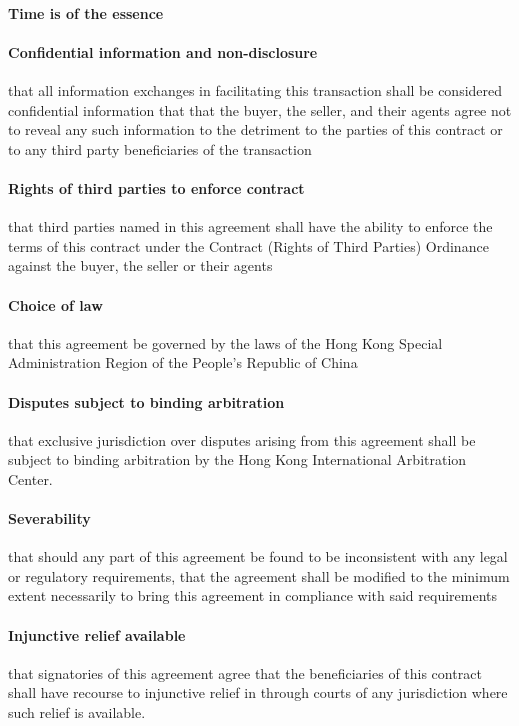 \documentclass[10pt]{article}
\begin{document}
\paragraph{Time is of the essence}

\paragraph{Confidential information and non-disclosure} that all information exchanges in facilitating this transaction shall be considered confidential information that that the buyer, the seller, and their agents agree not to reveal any such information to the detriment to the parties of this contract or to any third party beneficiaries of the transaction

\paragraph{Rights of third parties to enforce contract} that third parties named in this agreement shall have the ability to enforce the terms of this contract under the Contract (Rights of Third Parties) Ordinance against the buyer, the seller or their agents

\paragraph{Choice of law} that this agreement be governed by the laws of the Hong Kong Special Administration Region of the People’s Republic of China

\paragraph{Disputes subject to binding arbitration} that exclusive
jurisdiction over disputes arising from this agreement shall be subject to binding arbitration by the Hong Kong International Arbitration Center.

\paragraph{Severability} that should any part of this agreement be found to be inconsistent with any legal or regulatory requirements, that the agreement shall be modified to the minimum extent necessarily to bring this agreement in compliance with said requirements

\paragraph{Injunctive relief available} that signatories of this agreement agree that the beneficiaries of this contract shall have recourse to injunctive relief in through courts of any jurisdiction where such relief is available.
\end{document}
